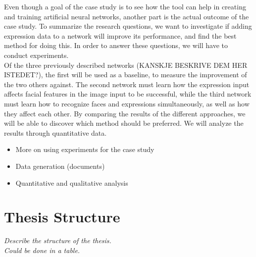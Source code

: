 \noindent Even though a goal of the case study is to see how the tool can help in creating and training artificial neural networks, another part is the actual outcome of the case study. To summarize the research questions, we want to investigate if adding expression data to a network will improve its performance, and find the best method for doing this. In order to answer these questions, we will have to conduct experiments. \\

\noindent Of the three previously described networks (KANSKJE BESKRIVE DEM HER ISTEDET?), the first will be used as a baseline, to measure the improvement of the two others against. The second network must learn how the expression input affects facial features in the image input to be successful, while the third network must learn how to recognize faces and expressions simultaneously, as well as how they affect each other. By comparing the results of the different approaches, we will be able to discover which method should be preferred. We will analyze the results through quantitative data.

\begin{itemize}
    \item More on using experiments for the case study
    \item Data generation (documents)
    \item Quantitative and qualitative analysis
\end{itemize}

\section{Thesis Structure}

\textit{Describe the structure of the thesis. \\
Could be done in a table.}

